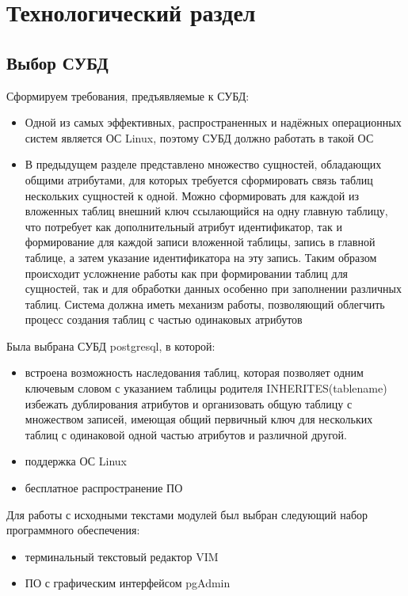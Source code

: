 \chapter{Технологический раздел}

\section{Выбор СУБД}
Сформируем требования, предъявляемые к СУБД:
\begin{itemize}
	\item 
Одной из самых эффективных, распространенных и надёжных операционных систем является ОС Linux, поэтому СУБД должно работать в такой ОС
	\item 
В предыдущем разделе представлено множество сущностей, обладающих общими атрибутами, для которых требуется сформировать связь таблиц нескольких сущностей к одной. Можно сформировать для каждой из вложенных таблиц внешний ключ ссылающийся на одну главную таблицу, что потребует как дополнительный атрибут идентификатор, так и формирование для каждой записи вложенной таблицы, запись в главной таблице, а затем указание идентификатора на эту запись. Таким образом происходит усложнение работы как при формировании таблиц для сущностей, так и для обработки данных особенно при заполнении различных таблиц. Система должна иметь механизм работы, позволяющий облегчить процесс создания таблиц с частью одинаковых атрибутов
\end{itemize}

Была выбрана СУБД postgresql, в которой:
\begin{itemize}
	\item 
		встроена возможность наследования таблиц, которая позволяет одним ключевым словом с указанием таблицы родителя INHERITES(tablename) избежать дублирования атрибутов и организовать общую таблицу с множеством записей, имеющая общий первичный ключ для нескольких таблиц с одинаковой одной частью атрибутов и различной другой.
	\item 
		поддержка ОС Linux
	\item 
		бесплатное распространение ПО
\end{itemize}
Для работы с исходными текстами модулей был выбран следующий набор программного обеспечения:
\begin{itemize}
	\item терминальный текстовый редактор VIM
	\item ПО с графическим интерфейсом pgAdmin
\end{itemize}

